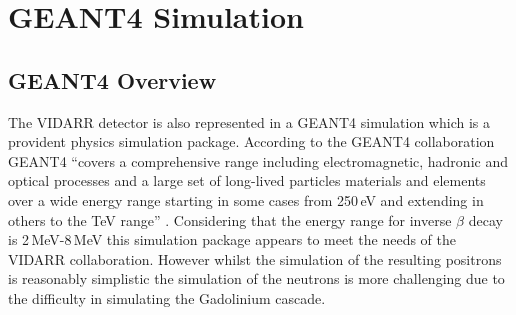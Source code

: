 

\chapter{GEANT4 Simulation}\label{chp:geant4Simulation}
\ifpdf
    \graphicspath{{Chapter4/Figs/Raster/}{Chapter4/Figs/PDF/}{Chapter4/Figs/}}
\else
    \graphicspath{{Chapter4/Figs/Vector/}{Chapter4/Figs/}}
\fi

\section{GEANT4 Overview}\label{sec:geant4Simulation_g4Overview}
The VIDARR detector is also represented in a GEANT4 simulation which is a provident physics simulation package. According to the GEANT4 collaboration GEANT4 ``covers a comprehensive range including electromagnetic, hadronic and optical processes and a large set of long-lived particles materials and elements over a wide energy range starting in some cases from 250\,eV and extending in others to the TeV range'' \cite{Agostinelli:2002hh}. Considering that the energy range for inverse $\beta$ decay is 2\,MeV-8\,MeV \cite{Mueller_2011} this simulation package appears to meet the needs of the VIDARR collaboration. However whilst the simulation of the resulting positrons is reasonably simplistic the simulation of the neutrons is more challenging due to the difficulty in simulating the Gadolinium cascade. 

